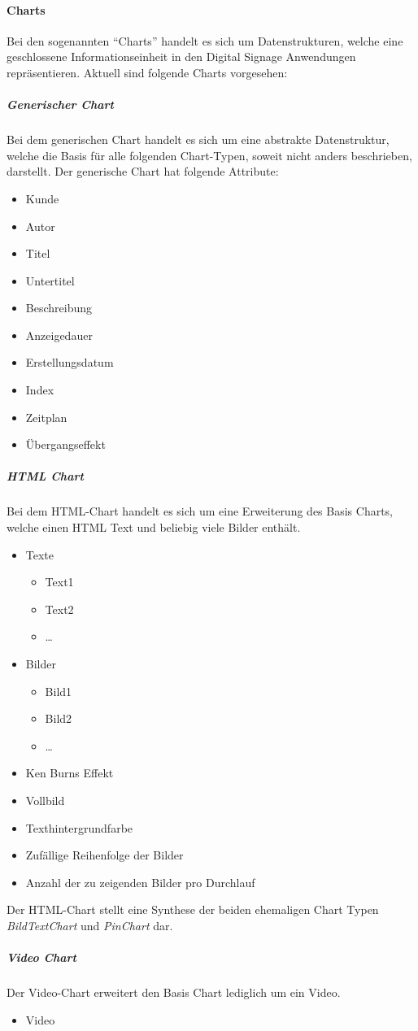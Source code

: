 \documentclass[a4paper]{article}
\begin{document}
	\paragraph{Charts}
	Bei den sogenannten \enquote{Charts} handelt es sich um Datenstrukturen, welche eine geschlossene Informationseinheit in den Digital Signage Anwendungen repräsentieren.
	Aktuell sind folgende Charts vorgesehen:
	\subparagraph{Generischer Chart}
	Bei dem generischen Chart handelt es sich um eine abstrakte Datenstruktur, welche die Basis für alle folgenden Chart-Typen, soweit nicht anders beschrieben, darstellt.
	Der generische Chart hat folgende Attribute:
	\begin{itemize}
	\item Kunde
	\item Autor
	\item Titel
	\item Untertitel
	\item Beschreibung
	\item Anzeigedauer
	\item Erstellungsdatum
	\item Index
	\item Zeitplan
	\item Übergangseffekt
	\end{itemize}
	\subparagraph{HTML Chart}
	Bei dem HTML-Chart handelt es sich um eine Erweiterung des Basis Charts, welche einen HTML Text und beliebig viele Bilder enthält.
	\begin{itemize}
	\item Texte
		\begin{itemize}
		\item Text1
		\item Text2
		\item …
		\end{itemize}
	\item Bilder
		\begin{itemize}
		\item Bild1
		\item Bild2
		\item …
		\end{itemize}
	\item Ken Burns Effekt
	\item Vollbild
	\item Texthintergrundfarbe
	\item Zufällige Reihenfolge der Bilder
	\item Anzahl der zu zeigenden Bilder pro Durchlauf
	\end{itemize}
	Der HTML-Chart stellt eine Synthese der beiden ehemaligen Chart Typen \emph{BildTextChart} und \emph{PinChart} dar.
	\subparagraph{Video Chart}
	Der Video-Chart erweitert den Basis Chart lediglich um ein Video.
	\begin{itemize}
	\item Video
	\end{itemize}
\end{document}
